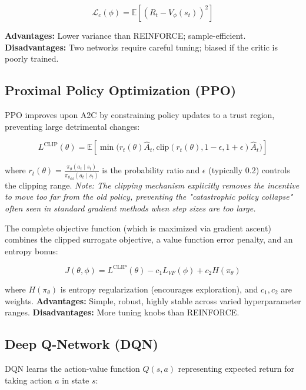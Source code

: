 \documentclass[11pt]{article}
\begin{document}
\begin{equation}
\mathcal{L}_c(\phi) = \mathbb{E} \left[ (R_t - V_\phi(s_t))^2 \right]
\end{equation}

\textbf{Advantages:} Lower variance than REINFORCE; sample-efficient.
\textbf{Disadvantages:} Two networks require careful tuning; biased if the critic is poorly trained.

\subsection{Proximal Policy Optimization (PPO)}
PPO improves upon A2C by constraining policy updates to a trust region, preventing large detrimental changes:

\begin{equation}
L^{\mathrm{CLIP}}(\theta) = \mathbb{E} \left[ \min\bigl( r_t(\theta) \hat{A}_t, \text{clip}(r_t(\theta), 1-\epsilon, 1+\epsilon) \hat{A}_t \bigr) \right]
\end{equation}

where $r_t(\theta) = \frac{\pi_\theta(a_t\mid s_t)}{\pi_{\theta_{\mathrm{old}}}(a_t\mid s_t)}$ is the probability ratio and $\epsilon$ (typically 0.2) controls the clipping range. \textit{Note: The clipping mechanism explicitly removes the incentive to move too far from the old policy, preventing the "catastrophic policy collapse" often seen in standard gradient methods when step sizes are too large.}

The complete objective function (which is maximized via gradient ascent) combines the clipped surrogate objective, a value function error penalty, and an entropy bonus:

\begin{equation}
J(\theta, \phi) = L^{\mathrm{CLIP}}(\theta) - c_1 L_{VF}(\phi) + c_2 H(\pi_\theta)
\end{equation}

where $H(\pi_\theta)$ is entropy regularization (encourages exploration), and $c_1, c_2$ are weights.
\textbf{Advantages:} Simple, robust, highly stable across varied hyperparameter ranges.
\textbf{Disadvantages:} More tuning knobs than REINFORCE.

\subsection{Deep Q-Network (DQN)}
DQN learns the action-value function $Q(s,a)$ representing expected return for taking action $a$ in state $s$:
\end{document}
